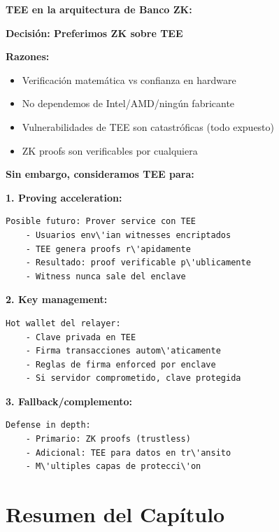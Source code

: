 \documentclass[11pt,a4paper,twoside]{book}
\begin{document}
\begin{bancozk}
\textbf{TEE en la arquitectura de Banco ZK:}

\textbf{Decisi\'on: Preferimos ZK sobre TEE}

\textbf{Razones:}
\begin{itemize}
    \item Verificaci\'on matem\'atica vs confianza en hardware
    \item No dependemos de Intel/AMD/ning\'un fabricante
    \item Vulnerabilidades de TEE son catastr\'oficas (todo expuesto)
    \item ZK proofs son verificables por cualquiera
\end{itemize}

\textbf{Sin embargo, consideramos TEE para:}

\textbf{1. Proving acceleration:}
\begin{verbatim}
Posible futuro: Prover service con TEE
    - Usuarios env\'ian witnesses encriptados
    - TEE genera proofs r\'apidamente
    - Resultado: proof verificable p\'ublicamente
    - Witness nunca sale del enclave
\end{verbatim}

\textbf{2. Key management:}
\begin{verbatim}
Hot wallet del relayer:
    - Clave privada en TEE
    - Firma transacciones autom\'aticamente
    - Reglas de firma enforced por enclave
    - Si servidor comprometido, clave protegida
\end{verbatim}

\textbf{3. Fallback/complemento:}
\begin{verbatim}
Defense in depth:
    - Primario: ZK proofs (trustless)
    - Adicional: TEE para datos en tr\'ansito
    - M\'ultiples capas de protecci\'on
\end{verbatim}
\end{bancozk}

\section{Resumen del Cap\'itulo}
\label{sec:resumen-cap3}
\end{document}
